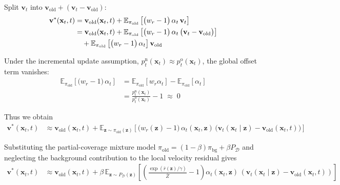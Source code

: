 \documentclass{article} %
\begin{document}
Split $\mathbf{v}_t$ into $\mathbf{v}_{\mathrm{old}} + (\mathbf{v}_t - \mathbf{v}_{\mathrm{old}})$:
\begin{align}
    \mathbf{v}^*(\mathbf{x}_t, t)
    &=
    \mathbf{v}_{\mathrm{old}}(\mathbf{x}_t, t)
    +
    \mathbb{E}_{\pi_{\mathrm{old}}}
    \left[
        \bigl( w_r - 1 \bigr)\,
        \alpha_t\,
        \mathbf{v}_t
    \right]
    \\
    &=
    \mathbf{v}_{\mathrm{old}}(\mathbf{x}_t, t)
    +
    \mathbb{E}_{\pi_{\mathrm{old}}}
    \left[
        \bigl( w_r - 1 \bigr)\,
        \alpha_t\,
        \bigl( \mathbf{v}_t - \mathbf{v}_{\mathrm{old}} \bigr)
    \right]
    \notag \\
    &\quad
    +
    \mathbb{E}_{\pi_{\mathrm{old}}}
    \left[
        \bigl( w_r - 1 \bigr)\,
        \alpha_t
    \right]
    \mathbf{v}_{\mathrm{old}}
\end{align}

Under the incremental update assumption, $p_t^{\mathrm{n}}(\mathbf{x}_t) \approx p_t^{\mathrm{o}}(\mathbf{x}_t)$, the global offset term vanishes:
\begin{align}
    \mathbb{E}_{\pi_{\mathrm{old}}}
    \left[
        \bigl( w_r - 1 \bigr)\,
        \alpha_t
    \right]
    &=
    \mathbb{E}_{\pi_{\mathrm{old}}}
    \left[
        w_r \alpha_t
    \right]
    -
    \mathbb{E}_{\pi_{\mathrm{old}}}
    \left[
        \alpha_t
    \right]
    \\
    &=
    \frac{p_t^{\mathrm{n}}(\mathbf{x}_t)}{p_t^{\mathrm{o}}(\mathbf{x}_t)}
    -
    1
    \;\approx\;
    0
\end{align}

Thus we obtain
\begin{align}
    \mathbf{v}^*(\mathbf{x}_t, t)
    &\approx
    \mathbf{v}_{\mathrm{old}}(\mathbf{x}_t, t)
    +
    \mathbb{E}_{\mathbf{z} \sim \pi_{\mathrm{old}}(\mathbf{z})}
    \left[
        \bigl( w_r(\mathbf{z}) - 1 \bigr)\,
        \alpha_t(\mathbf{x}_t, \mathbf{z})\,
        \bigl( \mathbf{v}_t(\mathbf{x}_t \mid \mathbf{z}) - \mathbf{v}_{\mathrm{old}}(\mathbf{x}_t, t) \bigr)
    \right]
\end{align}

Substituting the partial-coverage mixture model $\pi_{\mathrm{old}} = (1-\beta)\pi_{\mathrm{bg}} + \beta P_{\mathcal{D}}$ and neglecting the background contribution to the local velocity residual gives
\begin{align}
    \mathbf{v}^*(\mathbf{x}_t, t)
    &\approx
    \mathbf{v}_{\mathrm{old}}(\mathbf{x}_t, t)
    +
    \beta\,
    \mathbb{E}_{\mathbf{z} \sim P_{\mathcal{D}}(\mathbf{z})}
    \left[
        \left(
            \frac{\exp\!\left( \bar{r}(\mathbf{z})/\gamma \right)}{\bar{Z}}
            - 1
        \right)
        \alpha_t(\mathbf{x}_t, \mathbf{z})\,
        \left(
            \mathbf{v}_t(\mathbf{x}_t \mid \mathbf{z})
            -
            \mathbf{v}_{\mathrm{old}}(\mathbf{x}_t, t)
        \right)
    \right]
\end{align}
\end{document}
